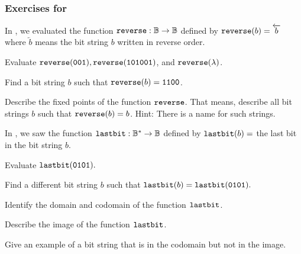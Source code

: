 \subsubsection*{Exercises for 
\subbitstringfunctions}

\begin{exer}[\exerP] %
\label{exer_reverse_bit_string}
    In , we evaluated the function $\texttt{reverse}: \mathbb{B} \to \mathbb{B}$ defined by $\texttt{reverse}(b) = \overleftarrow{b}$ where $\overleftarrow{b}$ means the bit string $b$ written in reverse order. 
        \begin{exerpart}
            \item  Evaluate $\texttt{reverse}(\texttt{001}), \texttt{reverse}(\texttt{101001})$, and $\texttt{reverse}(\lambda)$.
            \item Find a bit string $b$ such that $\texttt{reverse}(b) = \texttt{1100}$.
            \item Describe the fixed points of the function $\texttt{reverse}$. That means, describe all bit strings $b$ such that $\texttt{reverse}(b) =b$.  Hint: There is a name for such strings. 
        \end{exerpart}
\end{exer}

\begin{exer} [\exerP] %
\label{exer_lastbit_function}
    In , we saw the function $\texttt{lastbit}:\mathbb{B}^* \to \mathbb{B}$ defined by $\texttt{lastbit}(b) =$ the last bit in the bit string $b$.
        \begin{exerpart}
            \item Evaluate $\texttt{lastbit}(\texttt{0101}).$
            \item Find a different bit string $b$ such that $\texttt{lastbit}(b)=\texttt{lastbit}(\texttt{0101}).$
            \item Identify the domain and codomain of the function $\texttt{lastbit}$.
            \item Describe the image of the function $\texttt{lastbit}$. 
            \item Give an example of a bit string that is in the codomain but not in the image.       
        \end{exerpart}
\end{exer}


